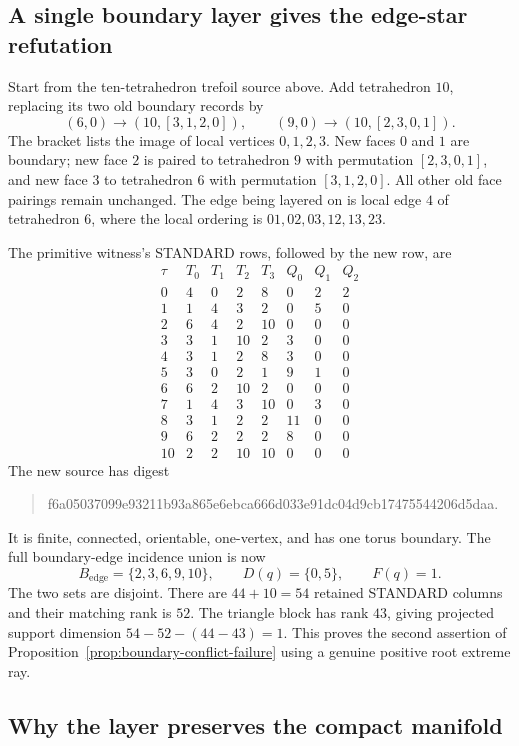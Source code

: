 \subsection{A single boundary layer gives the edge-star refutation}

Start from the ten-tetrahedron trefoil source above.  Add tetrahedron
$10$, replacing its two old boundary records by
\[
 (6,0)\longrightarrow(10,[3,1,2,0]),\qquad
 (9,0)\longrightarrow(10,[2,3,0,1]).
\]
The bracket lists the image of local vertices $0,1,2,3$.
New faces $0$ and $1$ are boundary; new face $2$ is paired to tetrahedron
$9$ with permutation $[2,3,0,1]$, and new face $3$ to tetrahedron $6$
with permutation $[3,1,2,0]$.  All other old face pairings remain unchanged.
The edge being layered on is local edge $4$ of tetrahedron $6$, where
the local ordering is $01,02,03,12,13,23$.

The primitive witness's STANDARD rows, followed by the new row, are
\[
\begin{array}{c|rrrr|rrr}
\tau&T_0&T_1&T_2&T_3&Q_0&Q_1&Q_2\\\hline
0&4&0&2&8&0&2&2\\
1&1&4&3&2&0&5&0\\
2&6&4&2&10&0&0&0\\
3&3&1&10&2&3&0&0\\
4&3&1&2&8&3&0&0\\
5&3&0&2&1&9&1&0\\
6&6&2&10&2&0&0&0\\
7&1&4&3&10&0&3&0\\
8&3&1&2&2&11&0&0\\
9&6&2&2&2&8&0&0\\\hline
10&2&2&10&10&0&0&0
\end{array}
\]
The new source has digest
\begin{quote}\small\ttfamily
f6a05037099e93211b93a865e6ebca666d033e91dc04d9cb17475544206d5daa.
\end{quote}
It is finite, connected, orientable, one-vertex, and has one torus boundary.
The full boundary-edge incidence union is now
\[
 B_{\mathrm{edge}}=\{2,3,6,9,10\},
 \qquad D(q)=\{0,5\},\qquad F(q)=1.
\]
The two sets are disjoint.  There are $44+10=54$ retained STANDARD
columns and their matching rank is $52$.  The triangle block has rank
$43$, giving projected support dimension $54-52-(44-43)=1$.
This proves the second assertion of
Proposition~\ref{prop:boundary-conflict-failure} using a genuine positive
root extreme ray.

\subsection{Why the layer preserves the compact manifold}

